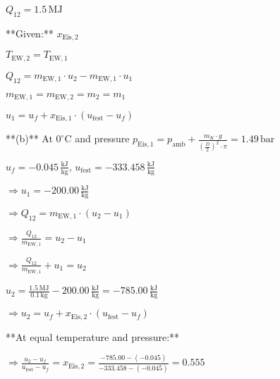 \( Q_{12} = 1.5 \, \text{MJ} \)  

**Given:**  
\( x_{\text{Eis},2} \)  

\( T_{\text{EW},2} = T_{\text{EW},1} \)  

\( Q_{12} = m_{\text{EW},1} \cdot u_2 - m_{\text{EW},1} \cdot u_1 \)  

\( m_{\text{EW},1} = m_{\text{EW},2} = m_2 = m_1 \)  

\( u_1 = u_f + x_{\text{Eis},1} \cdot (u_{\text{fest}} - u_f) \)  

**(b)** At \( 0^\circ \text{C} \) and pressure \( p_{\text{Eis},1} = p_{\text{amb}} + \frac{m_K \cdot g}{\left(\frac{D}{2}\right)^2 \cdot \pi} = 1.49 \, \text{bar} \)  

\( u_f = -0.045 \, \frac{\text{kJ}}{\text{kg}}, \, u_{\text{fest}} = -333.458 \, \frac{\text{kJ}}{\text{kg}} \)  

\( \Rightarrow u_1 = -200.00 \, \frac{\text{kJ}}{\text{kg}} \)  

\( \Rightarrow Q_{12} = m_{\text{EW},1} \cdot (u_2 - u_1) \)  

\( \Rightarrow \frac{Q_{12}}{m_{\text{EW},1}} = u_2 - u_1 \)  

\( \Rightarrow \frac{Q_{12}}{m_{\text{EW},1}} + u_1 = u_2 \)  

\( u_2 = \frac{1.5 \, \text{MJ}}{0.1 \, \text{kg}} - 200.00 \, \frac{\text{kJ}}{\text{kg}} = -785.00 \, \frac{\text{kJ}}{\text{kg}} \)  

\( \Rightarrow u_2 = u_f + x_{\text{Eis},2} \cdot (u_{\text{fest}} - u_f) \)  

**At equal temperature and pressure:**  

\( \Rightarrow \frac{u_2 - u_f}{u_{\text{fest}} - u_f} = x_{\text{Eis},2} = \frac{-785.00 - (-0.045)}{-333.458 - (-0.045)} = 0.555 \)